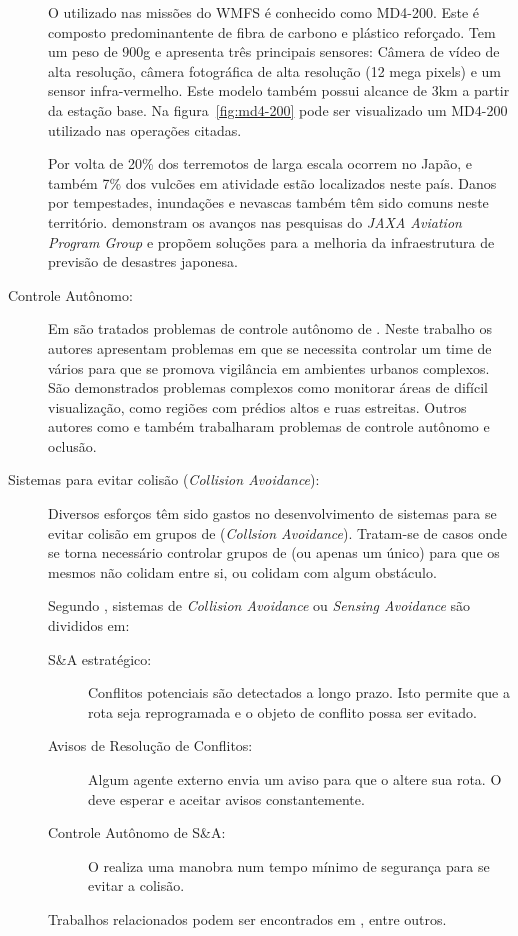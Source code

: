 \begin{description}
O \vant utilizado nas missões do WMFS é conhecido como MD4-200. Este \vant é composto predominantente de fibra de carbono e plástico reforçado. Tem um peso de 900g e apresenta três principais sensores: Câmera de vídeo de alta resolução, câmera fotográfica de alta resolução (12 mega pixels) e um sensor infra-vermelho. Este modelo também possui alcance de 3km a partir da estação base. Na figura~\ref{fig:md4-200} pode ser visualizado um MD4-200 utilizado nas operações citadas.

Por volta de 20\% dos terremotos de larga escala ocorrem no Japão, e também 7\% dos vulcões em atividade estão localizados neste país. Danos por tempestades, inundações e nevascas também têm sido comuns neste território. \cite{Sasa2008} demonstram os avanços nas pesquisas do \emph{JAXA Aviation Program Group} e propõem soluções para a melhoria da infraestrutura de previsão de desastres japonesa.

\item[Controle Autônomo: ]
Em \cite{Semsch2009} são tratados problemas de controle autônomo de \vants. Neste trabalho os autores apresentam problemas em que se necessita controlar um time de vários \vants para que se promova vigilância em ambientes urbanos complexos. São demonstrados problemas complexos como monitorar áreas de difícil visualização, como regiões com prédios altos e ruas estreitas. Outros autores como \cite{KimAndKim} e \cite{Sarmiento2004} também trabalharam problemas de controle autônomo e oclusão.

\item[ Sistemas para evitar colisão (\emph{Collision Avoidance}):]
Diversos esforços têm sido gastos no desenvolvimento de sistemas para se evitar colisão em grupos de \vants (\emph{Collsion Avoidance}). Tratam-se de casos onde se torna necessário controlar grupos de \vants (ou apenas um único) para que os mesmos não colidam entre si, ou colidam com algum obstáculo.

Segundo \cite{Hutchings2007}, sistemas de \emph{Collision Avoidance} ou \emph{Sensing Avoidance} são divididos em:
	\begin{description}
		\item[S\&A estratégico: ]  Conflitos potenciais são detectados a longo prazo. Isto permite que a rota seja reprogramada e o objeto de conflito possa ser evitado.
		\item[Avisos de Resolução de Conflitos: ] Algum agente externo envia um aviso para que o \vant altere sua rota. O \vant deve esperar e aceitar avisos constantemente.
		\item[Controle Autônomo de S\&A: ] O \vant realiza uma manobra num tempo mínimo de segurança para se evitar a colisão.
	\end{description}

Trabalhos relacionados podem ser encontrados em \cite{Hutchings2007,Bryner2007,Deschenes2004,Taylor2005}, entre outros.

\end{description}

